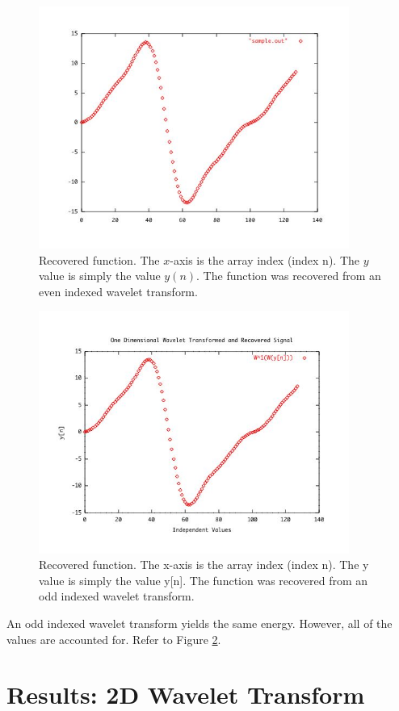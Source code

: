 \begin{figure}
\includegraphics [width=4in]{sample.jpg}
\caption{Recovered function.  The $x$-axis is the array index (index n).  The $y$ value is simply the value $y(n)$.  The function was recovered from an even indexed wavelet transform. }
\label{recoverEven}
\end{figure}

 
\begin{figure}
\includegraphics [width=4in]{recovered.jpg}
\caption{Recovered function.  The x-axis is the array index (index n).  The y value is simply the value y[n].  The function was recovered from an odd indexed wavelet transform. }
\label{recoverOdd}
\end{figure}

An odd indexed wavelet transform yields the same energy.  However, all of the values are accounted for.  Refer to Figure \ref{recoverOdd}.  

\section {Results: 2D Wavelet Transform }

